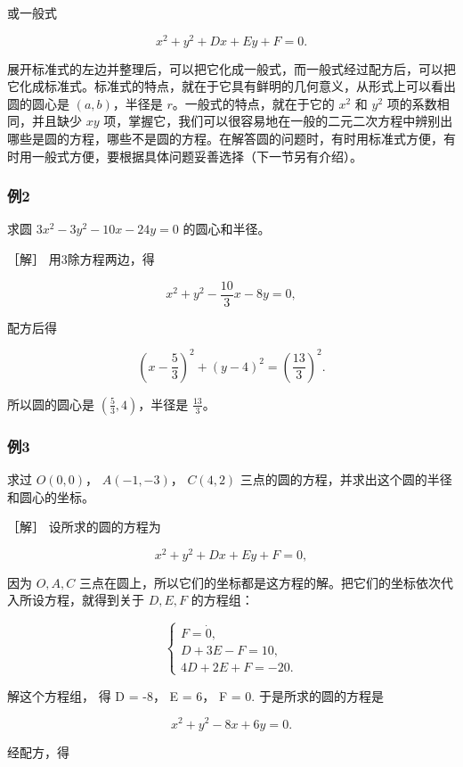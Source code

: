或一般式

\[
x^{2} + y^{2} + D x + E y + F = 0.
\]

展开标准式的左边并整理后，可以把它化成一般式，而一般式经过配方后，可以把它化成标准式。标准式的特点，就在于它具有鲜明的几何意义，从形式上可以看出圆的圆心是
\((a, b)\)，半径是 \(r\)。一般式的特点，就在于它的 \(x^2\) 和 \(y^2\)
项的系数相同，并且缺少 \(xy\)
项，掌握它，我们可以很容易地在一般的二元二次方程中辨别出哪些是圆的方程，哪些不是圆的方程。在解答圆的问题时，有时用标准式方便，有时用一般式方便，要根据具体问题妥善选择（下一节另有介绍）。

\subsubsection{例2}\label{ux4f8b2-19}

求圆 \(3x^{2}-3y^{2}-10x-24y=0\) 的圆心和半径。

［解］ 用3除方程两边，得

\[
x^{2} + y^{2} - \frac {10}{3} x - 8 y = 0,
\]

配方后得

\[
\left(x - \frac {5}{3}\right) ^ {2} + (y - 4) ^ {2} = \left(\frac {13}{3}\right) ^ {2}.
\]

所以圆的圆心是 \(\left(\frac{5}{3},4\right)\)，半径是 \(\frac{13}{3}\)。

\subsubsection{例3}\label{ux4f8b3-12}

求过 \(O(0,0)\)， \(A(-1,-3)\)， \(C(4,2)\)
三点的圆的方程，并求出这个圆的半径和圆心的坐标。

［解］ 设所求的圆的方程为

\[
x^{2} + y^{2} + D x + E y + F = 0,
\]

因为 \(O, A, C\)
三点在圆上，所以它们的坐标都是这方程的解。把它们的坐标依次代入所设方程，就得到关于
\(D, E, F\) 的方程组：

\[
\left\{ \begin{array}{l} F = \dot {0}, \\ D + 3 E - F = 10, \\ 4 D + 2 E + F = - 20. \end{array} \right.
\]

解这个方程组， 得 D = -8， E = 6， F = 0. 于是所求的圆的方程是

\[
x^{2} + y^{2} - 8 x + 6 y = 0.
\]

经配方，得

